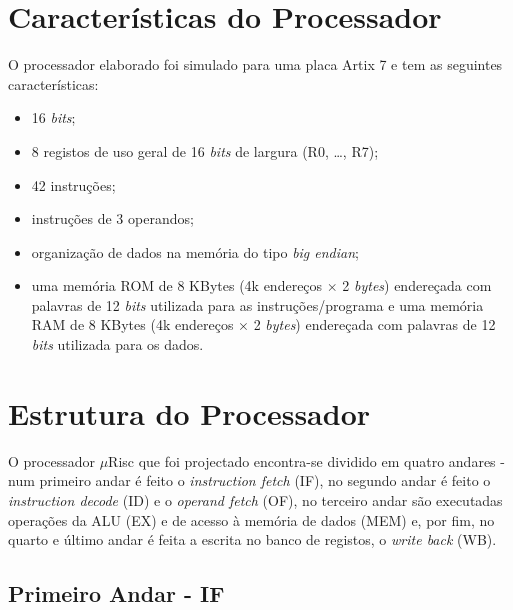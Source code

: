 \documentclass[11pt]{article}
\numberwithin{equation}{section}
\begin{document}
\section{Características do Processador}

O processador elaborado foi simulado para uma placa Artix 7 e tem as seguintes características:

\vspace{-2mm}

\begin{itemize}
  \item 16 \textit{bits};
  \vspace{-2.5mm}
  \item 8 registos de uso geral de 16 \textit{bits} de largura (R0, \ldots, R7);
  \vspace{-2.5mm}
  \item 42 instruções;
  \vspace{-2.5mm}
  \item instruções de 3 operandos;
  \vspace{-2.5mm}
  \item organização de dados na memória do tipo \textit{big endian};
  \vspace{-2.5mm}
  \item uma memória ROM de 8 KBytes (4k endereços $\times$ 2 \textit{bytes}) endereçada com palavras de 12 \textit{bits} utilizada para as instruções/programa e uma memória RAM de 8 KBytes (4k endereços $\times$ 2 \textit{bytes}) endereçada com palavras de 12 \textit{bits} utilizada para os dados.
  
\end{itemize}

\section{Estrutura do Processador}

O processador $\mu$Risc que foi projectado encontra-se dividido em quatro andares - num primeiro andar é feito o \textit{instruction fetch} (IF), no segundo andar é feito o \textit{instruction decode} (ID) e o \textit{operand fetch} (OF), no terceiro andar são executadas operações da ALU (EX) e de acesso à memória de dados (MEM) e, por fim, no quarto e último andar é feita a escrita no banco de registos, o \textit{write back} (WB).


\subsection{Primeiro Andar - IF}
\end{document}
